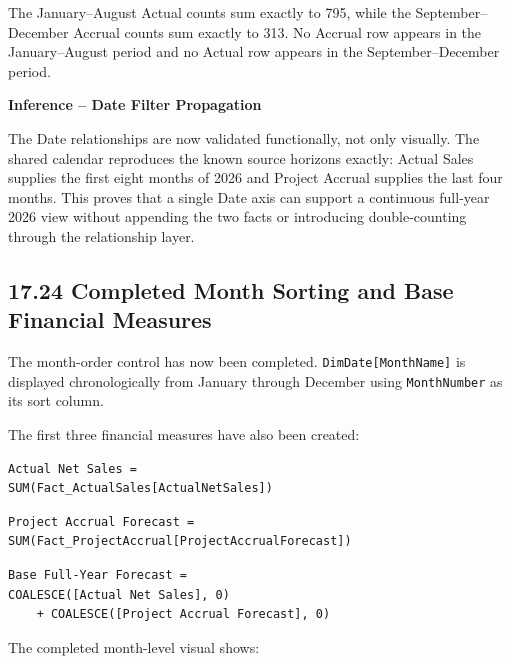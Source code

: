 \documentclass[11pt,a4paper]{article}
\begin{document}
The January--August Actual counts sum exactly to 795, while the September--
December Accrual counts sum exactly to 313. No Accrual row appears in the
January--August period and no Actual row appears in the September--December
period.

\begin{inferencebox}

\textbf{Inference -- Date Filter Propagation}

The Date relationships are now validated functionally, not only visually.
The shared calendar reproduces the known source horizons exactly:
Actual Sales supplies the first eight months of 2026 and Project Accrual
supplies the last four months. This proves that a single Date axis can support a
continuous full-year 2026 view without appending the two facts or introducing
double-counting through the relationship layer.

\end{inferencebox}

\subsection{17.24 Completed Month Sorting and Base Financial Measures}

The month-order control has now been completed. \texttt{DimDate[MonthName]} is
displayed chronologically from January through December using
\texttt{MonthNumber} as its sort column.

The first three financial measures have also been created:

\begin{lstlisting}[style=powerquery]
Actual Net Sales =
SUM(Fact_ActualSales[ActualNetSales])
\end{lstlisting}

\begin{lstlisting}[style=powerquery]
Project Accrual Forecast =
SUM(Fact_ProjectAccrual[ProjectAccrualForecast])
\end{lstlisting}

\begin{lstlisting}[style=powerquery]
Base Full-Year Forecast =
COALESCE([Actual Net Sales], 0)
    + COALESCE([Project Accrual Forecast], 0)
\end{lstlisting}

The completed month-level visual shows:
\end{document}
